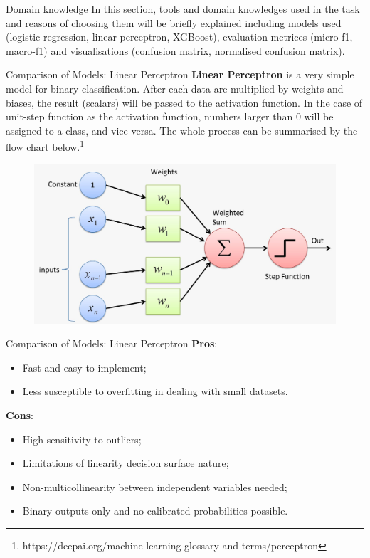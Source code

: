 \begin{frame}{Domain knowledge}
In this section, tools and domain knowledges used in the task and reasons of choosing them  will be briefly explained including models used (logistic regression, linear perceptron, XGBoost), evaluation metrices 
(micro-f1, macro-f1) and visualisations (confusion matrix, normalised confusion matrix).
\end{frame}


\begin{frame} {Comparison of Models: Linear Perceptron}
\textbf{Linear Perceptron} is a very simple model for binary classification. After each data are multiplied by weights and biases, the result (scalars) will be passed to the activation function. In the case of unit-step function as the activation function, numbers larger than 0 will be assigned to a class, and vice versa. The whole process can be summarised by the flow chart below.\footnote{https://deepai.org/machine-learning-glossary-and-terms/perceptron}
\begin{figure}[H]
    \centering
    \includegraphics[width=0.7\linewidth]{images/illustrate/linearp.jpeg}
\end{figure}
\end{frame}

\begin{frame} {Comparison of Models: Linear Perceptron}
\textbf{Pros}:
\begin{itemize}
\item Fast and easy to implement; 
\item Less susceptible to overfitting in dealing with small datasets.
\end{itemize}
\textbf{Cons}:
\begin{itemize}
\item High sensitivity to outliers; 
\item Limitations of linearity decision surface nature; 
\item Non-multicollinearity between independent variables needed;
\item Binary outputs only and no calibrated probabilities possible.
\end{itemize}
\end{frame}


